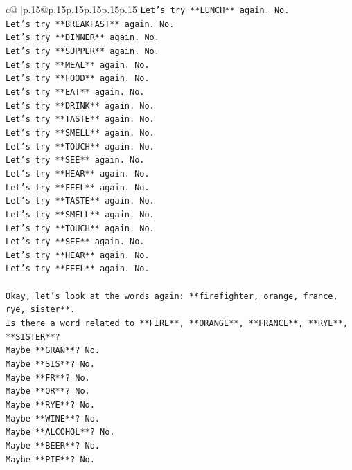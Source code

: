 \documentclass{article}
\begin{document}
{\begin{supertabular}{c@{$\;$}|p{.15\linewidth}@{}p{.15\linewidth}p{.15\linewidth}p{.15\linewidth}p{.15\linewidth}p{.15\linewidth}}
{{{\texttt{Let's try **LUNCH** again. No.} \\
\texttt{Let's try **BREAKFAST** again. No.} \\
\texttt{Let's try **DINNER** again. No.} \\
\texttt{Let's try **SUPPER** again. No.} \\
\texttt{Let's try **MEAL** again. No.} \\
\texttt{Let's try **FOOD** again. No.} \\
\texttt{Let's try **EAT** again. No.} \\
\texttt{Let's try **DRINK** again. No.} \\
\texttt{Let's try **TASTE** again. No.} \\
\texttt{Let's try **SMELL** again. No.} \\
\texttt{Let's try **TOUCH** again. No.} \\
\texttt{Let's try **SEE** again. No.} \\
\texttt{Let's try **HEAR** again. No.} \\
\texttt{Let's try **FEEL** again. No.} \\
\texttt{Let's try **TASTE** again. No.} \\
\texttt{Let's try **SMELL** again. No.} \\
\texttt{Let's try **TOUCH** again. No.} \\
\texttt{Let's try **SEE** again. No.} \\
\texttt{Let's try **HEAR** again. No.} \\
\texttt{Let's try **FEEL** again. No.} \\
\\ 
\texttt{Okay, let's look at the words again: **firefighter, orange, france, rye, sister**.} \\
\texttt{Is there a word related to **FIRE**, **ORANGE**, **FRANCE**, **RYE**, **SISTER**?} \\
\texttt{Maybe **GRAN**? No.} \\
\texttt{Maybe **SIS**? No.} \\
\texttt{Maybe **FR**? No.} \\
\texttt{Maybe **OR**? No.} \\
\texttt{Maybe **RYE**? No.} \\
\texttt{Maybe **WINE**? No.} \\
\texttt{Maybe **ALCOHOL**? No.} \\
\texttt{Maybe **BEER**? No.} \\
\texttt{Maybe **PIE**? No.} \\
}}}
\end{supertabular}}
\end{document}
